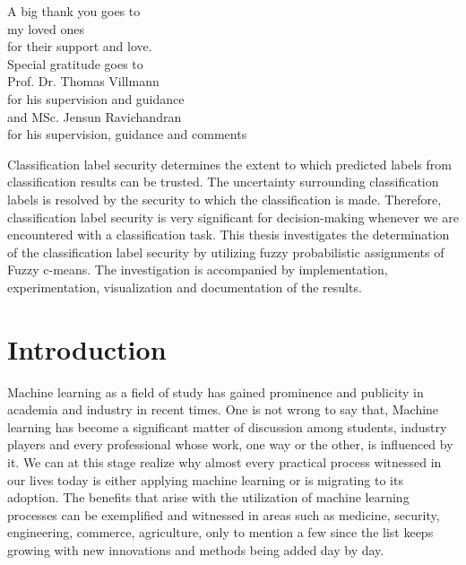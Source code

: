 \documentclass[english]{HSMW-Thesis}
\begin{document}
	\begin{center}
A big thank you goes to\\\vspace{20pt}
my loved ones \\
for their support and love.\\ \vspace{20pt}
Special gratitude goes to \\\vspace{20pt}
Prof. Dr. Thomas Villmann\\
for his supervision and guidance\\
and MSc. Jensun Ravichandran \\ for his supervision, guidance and comments
	\end{center}

\begin{Referat}
 Classification label security determines the extent to which predicted labels from classification results can be trusted. The uncertainty surrounding classification labels is resolved by the security to which the classification is made. Therefore, classification label security is very significant for decision-making whenever we are encountered with a classification task. This thesis investigates the determination of the classification label security by utilizing fuzzy probabilistic assignments of Fuzzy c-means. The investigation is accompanied by implementation, experimentation, visualization and documentation of the results.
\end{Referat}

\begin{Vorwort}
\end{Vorwort}

\Hauptteil

\chapter{Introduction}

Machine learning as a field of study has gained prominence and publicity in academia and industry in recent times. One is not wrong to say that, Machine learning has become a significant matter of discussion among students, industry players and every professional whose work, one way or the other, is influenced by it. We can at this stage realize why almost every practical process witnessed in our lives today is either applying machine learning or is migrating to its adoption. The benefits that arise with the utilization of machine learning processes can be exemplified and witnessed in areas such as medicine, security, engineering, commerce, agriculture, only to mention a few since the list keeps growing with new innovations and methods being added day by day. 
\end{document}
